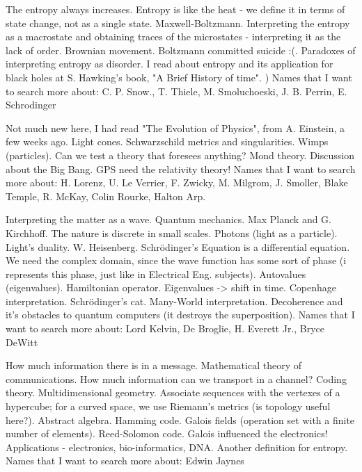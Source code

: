 \documentclass{cornell}
\begin{document}
\begin{tcolorbox}
\end{tcolorbox}

%
{The entropy always increases. Entropy is like the heat - we define it in terms of state change, not as a single state. Maxwell-Boltzmann. Interpreting the entropy as a macrostate and obtaining traces of the microstates - interpreting it as the lack of order. Brownian movement. }%
{Boltzmann committed suicide :(. Paradoxes of interpreting entropy as disorder. I read about entropy and its application for black holes at S. Hawking's book, "A Brief History of time".  )}%
{Names that I want to search more about: C. P. Snow., T. Thiele, M. Smoluchoeski, J. B. Perrin, E. Schrodinger}%

%
{Not much new here, I had read "The Evolution of Physics", from A. Einstein, a few weeks ago. Light cones. Schwarzschild metrics and singularities. Wimps (particles). Can we test a theory that foresees anything? Mond theory. Discussion about the Big Bang. GPS need the relativity theory!}%
{Names that I want to search more about: H. Lorenz, U. Le Verrier, F. Zwicky, M. Milgrom, J. Smoller, Blake Temple, R. McKay, Colin Rourke, Halton Arp.}%


%
{Interpreting the matter as a wave. Quantum mechanics. Max Planck and G. Kirchhoff. The nature is discrete in small scales. Photons (light as a particle). Light's duality. W. Heisenberg. Schrödinger's Equation is a differential equation. We need the complex domain, since the wave function has some sort of phase (i represents this phase, just like in Electrical Eng. subjects). Autovalues (eigenvalues). Hamiltonian operator. Eigenvalues -> shift in time. Copenhage interpretation. Schrödinger's cat. Many-World interpretation. Decoherence and it's obstacles to quantum computers (it destroys the superposition).}%
{Names that I want to search more about: Lord Kelvin, De Broglie, H. Everett Jr., Bryce DeWitt}%


%
{How much information there is in a message. Mathematical theory of communications. How much information can we transport in a channel? Coding theory. Multidimensional geometry. Associate sequences with the vertexes of a hypercube; for a curved space, we use Riemann's metrics (is topology useful here?). Abstract algebra. Hamming code. Galois fields (operation set with a finite number of elements). Reed-Solomon code. Galois influenced the electronics! }%
{Applications - electronics, bio-informatics, DNA. Another definition for entropy.}%
{Names that I want to search more about: Edwin Jaynes}%
\end{document}
